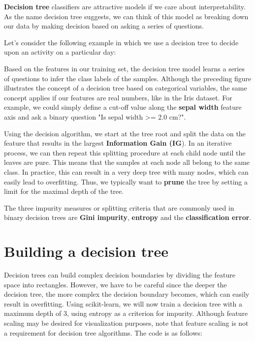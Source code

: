 \documentclass[11pt]{article}
\begin{document}
    \textbf{Decision tree} classifiers are attractive models if we care
about interpretability. As the name decision tree suggests, we can think
of this model as breaking down our data by making decision based on
asking a series of questions.

Let's consider the following example in which we use a decision tree to
decide upon an activity on a particular day:

    Based on the features in our training set, the decision tree model
learns a series of questions to infer the class labels of the samples.
Although the preceding figure illustrates the concept of a decision tree
based on categorical variables, the same concept applies if our features
are real numbers, like in the Iris dataset. For example, we could simply
define a cut-off value along the \textbf{sepal width} feature axis and
ask a binary question "Is sepal width \textgreater{}= 2.0 cm?".

Using the decision algorithm, we start at the tree root and split the
data on the feature that results in the largest \textbf{Information Gain
(IG}). In an iterative process, we can then repeat this splitting
procedure at each child node until the leaves are pure. This means that
the samples at each node all belong to the same class. In practice, this
can result in a very deep tree with many nodes, which can easily lead to
overfitting. Thus, we typically want to \textbf{prune} the tree by
setting a limit for the maximal depth of the tree.

The three impurity measures or splitting criteria that are commonly used
in binary decision trees are \textbf{Gini impurity}, \textbf{entropy}
and the \textbf{classification error}.

    \section{Building a decision tree}\label{building-a-decision-tree}

    Decision trees can build complex decision boundaries by dividing the
feature space into rectangles. However, we have to be careful since the
deeper the decision tree, the more complex the decision boundary
becomes, which can easily result in overfitting. Using scikit-learn, we
will now train a decision tree with a maximum depth of 3, using entropy
as a criterion for impurity. Although feature scaling may be desired for
visualization purposes, note that feature scaling is not a requirement
for decision tree algorithms. The code is as follows:
\end{document}
